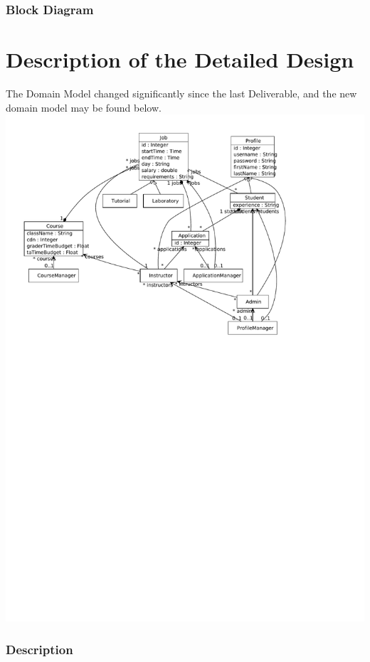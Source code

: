 \documentclass[12pt]{report}
\begin{document}
\section{Block Diagram}


\part{Description of the Detailed Design}
The Domain Model changed significantly since the last Deliverable, and the new domain model may be
found below.\\
\includegraphics[scale=0.9, viewport=0 500 900 900]{model/alternateModelDiagram}
\section{Description}
\end{document}
